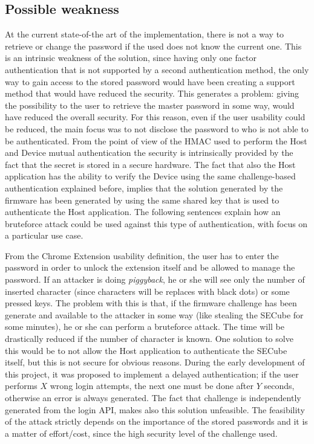 \subsection{Possible weakness}
\label{sec:weakness}
At the current state-of-the art of the implementation, there is not a way to retrieve or change the password if the used does not know the current one. This is an intrinsic weakness of the solution, since having only one factor authentication that is not supported by a second authentication method, the only way to gain access to the stored password would have been creating a support method that would have reduced the security. This generates a problem: giving the possibility to the user to retrieve the master password in some way, would have reduced the overall security. For this reason, even if the user usability could be reduced, the main focus was to not disclose the password to who is not able to be authenticated.\newline\newline
From the point of view of the HMAC used to perform the Host and Device mutual authentication the security is intrinsically provided by the fact that the secret is stored in a secure hardware. The fact that also the Host application has the ability to verify the Device using the same challenge-based authentication explained before, implies that the solution generated by the firmware has been generated by using the same shared key that is used to authenticate the Host application. The following sentences explain how an bruteforce attack could be used against this type of authentication, with focus on a particular use case.

From the Chrome Extension usability definition, the user has to enter the password in order to unlock the extension itself and be allowed to manage the password. If an attacker is doing \textit{piggyback}, he or she will see only the number of inserted character (since characters will be replaces with black dots) or some pressed keys. The problem with this is that, if the firmware challenge has been generate and available to the attacker in some way (like stealing the SECube for some minutes), he or she can perform a bruteforce attack. The time will be drastically reduced if the number of character is known. One solution to solve this would be to not allow the Host application to authenticate the SECube itself, but this is not secure for obvious reasons. 
During the early development of this project, it was proposed to implement a delayed authentication; if the user performs $X$ wrong login attempts, the next one must be done after $Y$ seconds, otherwise an error is always generated. The fact that challenge is independently generated from the login API, makes also this solution unfeasible. The feasibility of the attack strictly depends on the importance of the stored passwords and it is a matter of effort/cost, since the high security level of the challenge used.



